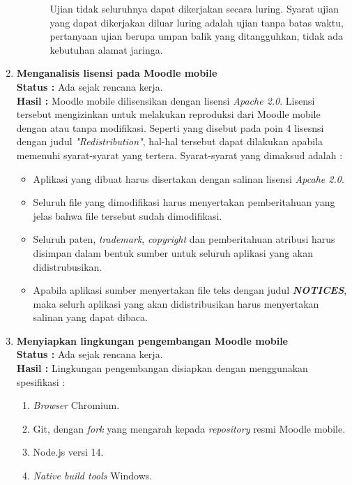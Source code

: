 \documentclass[a4paper,twoside]{article}
\begin{document}
\begin{enumerate}
\begin{itemize}
\begin{enumerate}
			Ujian tidak seluruhnya dapat dikerjakan secara luring. Syarat ujian yang dapat dikerjakan diluar luring adalah ujian tanpa batas waktu, pertanyaan ujian berupa umpan balik yang ditangguhkan, tidak ada kebutuhan alamat jaringa. \cite{moodle:39}
	\end{enumerate}


\end{itemize}


		\item \textbf{Menganalisis lisensi pada Moodle mobile}\\
		{\bf Status :} Ada sejak rencana kerja.\\
		{\bf Hasil :} Moodle mobile dilisensikan dengan lisensi \textit{Apache 2.0}. Lisensi tersebut mengizinkan untuk melakukan reproduksi dari Moodle mobile dengan atau tanpa modifikasi. Seperti yang disebut pada poin 4 lisesnsi dengan judul \textit{"Redistribution"}, hal-hal tersebut dapat dilakukan apabila memenuhi syarat-syarat yang tertera. Syarat-syarat yang dimaksud adalah :
\begin{itemize}
\item Aplikasi yang dibuat harus disertakan dengan salinan lisensi \textit{Apcahe 2.0}.
\item Seluruh file yang dimodifikasi harus menyertakan pemberitahuan yang jelas bahwa file tersebut sudah dimodifikasi.
\item Seluruh paten, \textit{trademark}, \textit{copyright} dan pemberitahuan atribusi harus disimpan dalam bentuk sumber untuk seluruh aplikasi yang akan didistrubusikan.
\item Apabila aplikasi sumber menyertakan file teks dengan judul \textit{\textbf{NOTICES}}, maka selurh aplikasi yang akan didistribusikan harus menyertakan salinan yang dapat dibaca.
\end{itemize}

		\item \textbf{Menyiapkan lingkungan pengembangan Moodle mobile}\\
		{\bf Status :} Ada sejak rencana kerja.\\
		{\bf Hasil :} Lingkungan pengembangan disiapkan dengan menggunakan spesifikasi :
\begin{enumerate}
	\item \textit{Browser} Chromium.
	\item Git, dengan \textit{fork} yang mengarah kepada \textit{repository} resmi Moodle mobile.
	\item Node.js versi 14.
	\item \textit{Native build tools} Windows.
\end{enumerate} 
		

\end{enumerate}
\end{document}
